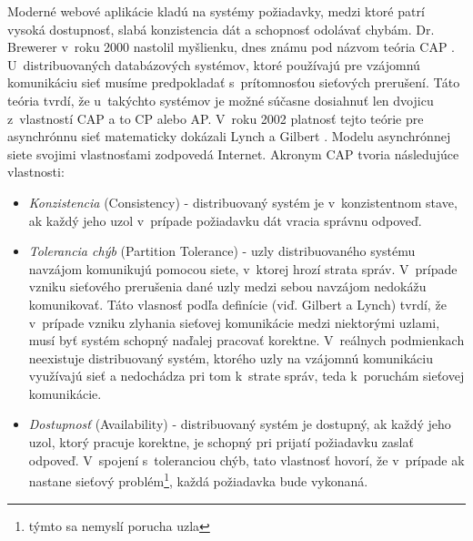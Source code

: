 \documentclass[11pt,twoside,a4paper]{book}
\begin{document}
Moderné webové aplikácie kladú na systémy požiadavky, medzi ktoré patrí vysoká dostupnosť, slabá konzistencia dát a schopnosť odolávať chybám. Dr. Brewerer v~roku 2000 nastolil myšlienku, dnes známu pod názvom teória CAP \cite{brewer2000towards}. U~distribuovaných databázových systémov, ktoré používajú pre vzájomnú komunikáciu sieť musíme predpokladať s~prítomnosťou sieťových prerušení. Táto teória tvrdí, že u~takýchto systémov je možné súčasne dosiahnuť len dvojicu z~vlastností CAP a to CP alebo AP. V~roku 2002 platnosť tejto teórie pre asynchrónnu sieť matematicky dokázali Lynch a Gilbert \cite{Gilbert:2002:BCF:564585.564601}. Modelu asynchrónnej siete svojimi vlastnosťami zodpovedá Internet. Akronym CAP tvoria následujúce vlastnosti:
\begin{itemize}
 \item 
  \emph{Konzistencia} (Consistency) - distribuovaný systém je v~konzistentnom stave, ak každý jeho uzol v~prípade požiadavku dát vracia správnu odpoveď.

\item
  \emph{Tolerancia chýb} (Partition Tolerance) - uzly distribuovaného systému navzájom komunikujú pomocou siete, v~ktorej hrozí strata správ. V~prípade vzniku sieťového prerušenia dané uzly medzi sebou navzájom nedokážu komunikovať. Táto vlasnosť podľa definície (viď. Gilbert a Lynch) tvrdí, že v~prípade vzniku zlyhania sieťovej komunikácie medzi niektorými uzlami, musí byť systém schopný naďalej pracovať korektne. V~reálnych podmienkach neexistuje distribuovaný systém, ktorého uzly na vzájomnú komunikáciu využívajú sieť a nedochádza pri tom k~strate správ, teda k~poruchám sieťovej komunikácie.

\item
  \emph{Dostupnosť} (Availability) - distribuovaný systém je dostupný, ak každý jeho uzol, ktorý pracuje korektne, je schopný pri prijatí požiadavku zaslať odpoveď. V~spojení s~toleranciou chýb, tato vlastnosť hovorí, že v~prípade ak nastane sieťový problém\footnote{týmto sa nemyslí porucha uzla}, každá požiadavka bude vykonaná.

\end{itemize}
\end{document}

